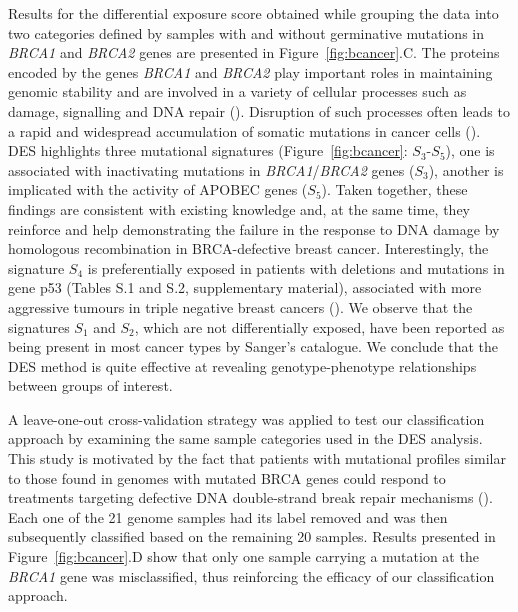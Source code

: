 \documentclass{bioinfo}
\begin{document}
Results for the differential exposure score obtained while grouping
the data into two categories defined by samples with and without
germinative mutations in \emph{BRCA1} and \emph{BRCA2} genes are
presented in Figure~\ref{fig:bcancer}.C. The proteins encoded by the
genes \emph{BRCA1} and \emph{BRCA2} play important roles in
maintaining genomic stability and are involved in a variety of
cellular processes such as damage, signalling and DNA repair
(\citealp{LY}). Disruption of such processes often leads to a rapid
and widespread accumulation of somatic mutations in cancer cells
(\citealp{Ash}). DES highlights three mutational signatures
(Figure~\ref{fig:bcancer}: $S_3$-$S_5$), one is associated with
inactivating mutations in \emph{BRCA1}/\emph{BRCA2} genes ($S_{3}$),
another is implicated with the activity of APOBEC genes ($S_5$). Taken
together, these findings are consistent with existing knowledge and,
at the same time, they reinforce and help demonstrating the failure in
the response to DNA damage by homologous recombination in
BRCA-defective breast cancer. Interestingly, the signature $S_4$ is
preferentially exposed in patients with deletions and mutations in
gene p53 (Tables S.1 and S.2, supplementary material), associated with
more aggressive tumours in triple negative breast cancers
(\citealp{DP}). We observe that the signatures $S_1$ and
$S_2$, which are not differentially exposed, have been reported as
being present in most cancer types by Sanger's catalogue. We conclude
that the DES method is quite effective at revealing genotype-phenotype
relationships between groups of interest.

A leave-one-out cross-validation strategy was applied to test our
classification approach by examining the same sample categories used
in the DES analysis. This study is motivated by the fact that patients
with mutational profiles similar to those found in genomes with
mutated BRCA genes could respond to treatments targeting defective DNA
double-strand break repair mechanisms (\citealp{Ash}).  Each one of
the 21 genome samples had its label removed and was then subsequently
classified based on the remaining 20 samples.  Results presented in
Figure~\ref{fig:bcancer}.D show that only one sample carrying a
mutation at the \emph{BRCA1} gene was misclassified, thus reinforcing
the efficacy of our classification approach.
\end{document}
